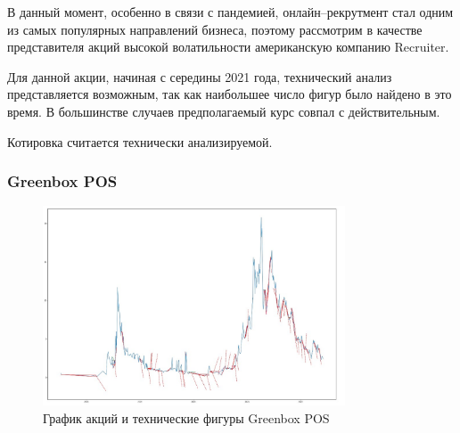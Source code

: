 \documentclass[bachelor, och, coursework]{SCWorks}
\begin{document}
    В данный момент, особенно в связи с пандемией, онлайн--рекрутмент стал одним
    из самых популярных направлений бизнеса, поэтому рассмотрим в качестве
    представителя акций высокой волатильности американскую компанию Recruiter.

    Для данной акции, начиная с середины 2021 года, технический анализ
    представляется возможным, так как наибольшее число фигур было найдено в это
    время. В большинстве случаев предполагаемый курс совпал с действительным.
    
    Котировка считается технически анализируемой.

    \subsubsection{Greenbox POS}
    
    \begin{figure}[H]
        \centering
        \includegraphics[width=0.8\textwidth]{pic/GBOX.jpg}
        \caption{График акций и технические фигуры Greenbox POS}
    \end{figure}
   
\end{document}
